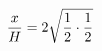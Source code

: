 \documentclass[preview]{standalone}
\begin{document}
\begin{align*}
\special{dvisvgm:raw <g id='unique000'>}\frac{x}{H} = 2 \sqrt{\frac{1}{2} \cdot \frac{1}{2}}\special{dvisvgm:raw </g>}
\end{align*}
\end{document}
